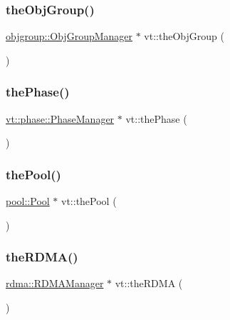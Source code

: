 \mbox{\label{namespacevt_a833f0115b692f578167cbd88e30d39c5}} 
\subsubsection{\texorpdfstring{the\+Obj\+Group()}{theObjGroup()}}
{\footnotesize\ttfamily \hyperlink{structvt_1_1objgroup_1_1_obj_group_manager}{objgroup\+::\+Obj\+Group\+Manager} $\ast$ vt\+::the\+Obj\+Group (\begin{DoxyParamCaption}{ }\end{DoxyParamCaption})}

\mbox{\label{namespacevt_a3799d6b51fb71d7b6505760aad457e61}} 
\subsubsection{\texorpdfstring{the\+Phase()}{thePhase()}}
{\footnotesize\ttfamily \hyperlink{structvt_1_1phase_1_1_phase_manager}{vt\+::phase\+::\+Phase\+Manager} $\ast$ vt\+::the\+Phase (\begin{DoxyParamCaption}{ }\end{DoxyParamCaption})}

\mbox{\label{namespacevt_aab3530d89a64e5ea903b0ccf303ecbb7}} 
\subsubsection{\texorpdfstring{the\+Pool()}{thePool()}}
{\footnotesize\ttfamily \hyperlink{structvt_1_1pool_1_1_pool}{pool\+::\+Pool} $\ast$ vt\+::the\+Pool (\begin{DoxyParamCaption}{ }\end{DoxyParamCaption})}

\mbox{\label{namespacevt_a68b8410bc2b86d3b5228d7dbb6b40bac}} 
\subsubsection{\texorpdfstring{the\+R\+D\+M\+A()}{theRDMA()}}
{\footnotesize\ttfamily \hyperlink{structvt_1_1rdma_1_1_r_d_m_a_manager}{rdma\+::\+R\+D\+M\+A\+Manager} $\ast$ vt\+::the\+R\+D\+MA (\begin{DoxyParamCaption}{ }\end{DoxyParamCaption})}

